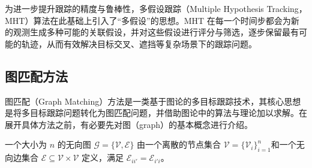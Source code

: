 为进一步提升跟踪的精度与鲁棒性，多假设跟踪（Multiple Hypothesis Tracking，MHT）算法\cite{1263228}在此基础上引入了“多假设”的思想。MHT 在每一个时间步都会为新的观测生成多种可能的关联假设，并对这些假设进行评分与筛选，逐步保留最有可能的轨迹，从而有效解决目标交叉、遮挡等复杂场景下的跟踪问题。

\subsection{图匹配方法}
图匹配（Graph Matching）方法是一类基于图论的多目标跟踪技术，其核心思想是将多目标跟踪问题转化为图匹配问题，并借助图论中的算法与理论加以求解。在展开具体方法之前，有必要先对图（graph）的基本概念进行介绍。

\begin{definition}
    一个大小为 $n$ 的无向图 $\mathcal G = \{\mathcal V, \mathcal E\}$ 由一个离散的节点集合 $\mathcal V = \{\mathcal V_i\}_{i=1}^{n}$和一个无向边集合 $\mathcal E \subseteq \mathcal V \times \mathcal V$ 定义，满足 $\mathcal E_{ii'} = \mathcal E_{i'i}$。
\end{definition}

